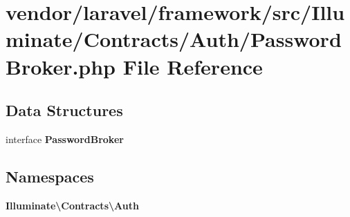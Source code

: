 \section{vendor/laravel/framework/src/\+Illuminate/\+Contracts/\+Auth/\+Password\+Broker.php File Reference}
\label{_contracts_2_auth_2_password_broker_8php}
\subsection*{Data Structures}
\begin{DoxyCompactItemize}
\item 
interface {\bf Password\+Broker}
\end{DoxyCompactItemize}
\subsection*{Namespaces}
\begin{DoxyCompactItemize}
\item 
 {\bf Illuminate\textbackslash{}\+Contracts\textbackslash{}\+Auth}
\end{DoxyCompactItemize}
